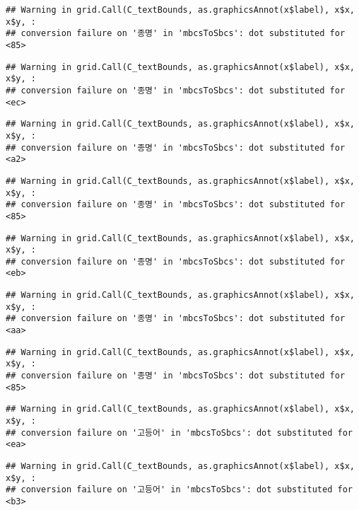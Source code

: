 \documentclass[
]{article}
\begin{document}
\begin{verbatim}
## Warning in grid.Call(C_textBounds, as.graphicsAnnot(x$label), x$x, x$y, :
## conversion failure on '종명' in 'mbcsToSbcs': dot substituted for <85>
\end{verbatim}

\begin{verbatim}
## Warning in grid.Call(C_textBounds, as.graphicsAnnot(x$label), x$x, x$y, :
## conversion failure on '종명' in 'mbcsToSbcs': dot substituted for <ec>
\end{verbatim}

\begin{verbatim}
## Warning in grid.Call(C_textBounds, as.graphicsAnnot(x$label), x$x, x$y, :
## conversion failure on '종명' in 'mbcsToSbcs': dot substituted for <a2>
\end{verbatim}

\begin{verbatim}
## Warning in grid.Call(C_textBounds, as.graphicsAnnot(x$label), x$x, x$y, :
## conversion failure on '종명' in 'mbcsToSbcs': dot substituted for <85>
\end{verbatim}

\begin{verbatim}
## Warning in grid.Call(C_textBounds, as.graphicsAnnot(x$label), x$x, x$y, :
## conversion failure on '종명' in 'mbcsToSbcs': dot substituted for <eb>
\end{verbatim}

\begin{verbatim}
## Warning in grid.Call(C_textBounds, as.graphicsAnnot(x$label), x$x, x$y, :
## conversion failure on '종명' in 'mbcsToSbcs': dot substituted for <aa>
\end{verbatim}

\begin{verbatim}
## Warning in grid.Call(C_textBounds, as.graphicsAnnot(x$label), x$x, x$y, :
## conversion failure on '종명' in 'mbcsToSbcs': dot substituted for <85>
\end{verbatim}

\begin{verbatim}
## Warning in grid.Call(C_textBounds, as.graphicsAnnot(x$label), x$x, x$y, :
## conversion failure on '고등어' in 'mbcsToSbcs': dot substituted for <ea>
\end{verbatim}

\begin{verbatim}
## Warning in grid.Call(C_textBounds, as.graphicsAnnot(x$label), x$x, x$y, :
## conversion failure on '고등어' in 'mbcsToSbcs': dot substituted for <b3>
\end{verbatim}
\end{document}
